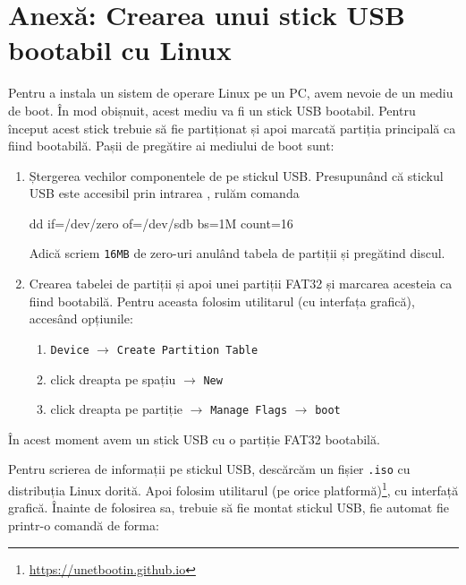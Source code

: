 \section{Anexă: Crearea unui stick USB bootabil cu Linux}
\label{sec:boot:usb-linux}

Pentru a instala un sistem de operare Linux pe un PC, avem nevoie de un mediu de
boot. În mod obișnuit, acest mediu va fi un stick USB bootabil. Pentru început
acest stick trebuie să fie partiționat și apoi marcată partiția principală ca
fiind bootabilă. Pașii de pregătire ai mediului de boot sunt:

\begin{enumerate}
	\item Ștergerea vechilor componentele de pe stickul USB. Presupunând că
          stickul USB este accesibil prin intrarea , rulăm
		comanda

\begin{screen}
dd if=/dev/zero of=/dev/sdb bs=1M count=16
\end{screen}

    Adică scriem \texttt{16MB} de zero-uri anulând tabela de partiții și pregătind discul.

	\item Crearea tabelei de partiții și apoi unei partiții FAT32 și
		marcarea acesteia ca fiind bootabilă. Pentru aceasta folosim
                utilitarul  (cu interfața grafică), accesând opțiunile:
                \begin{enumerate}
                  \item \texttt{Device} $\rightarrow$ \texttt{Create Partition Table}
                  \item click dreapta pe spațiu $\rightarrow$ \texttt{New}
                  \item click dreapta pe partiție $\rightarrow$ \texttt{Manage Flags} $\rightarrow$ \texttt{boot}
                \end{enumerate}

\end{enumerate}

În acest moment avem un stick USB cu o partiție FAT32 bootabilă.

Pentru scrierea de informații pe stickul USB, descărcăm un fișier \texttt{.iso}
cu distribuția
Linux dorită. Apoi folosim utilitarul  (pe orice
platformă)\footnote{\url{https://unetbootin.github.io}}, cu interfață grafică.
Înainte de folosirea sa, trebuie să fie montat stickul USB, fie automat fie
printr-o comandă de forma:

